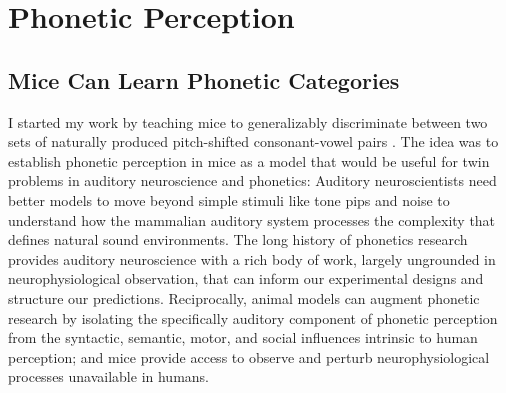 \section{Phonetic Perception}
\label{sec:phonemes}
\subsection{Mice Can Learn Phonetic Categories}

I started my work by teaching mice to generalizably discriminate between two sets of naturally produced pitch-shifted consonant-vowel pairs \cite{saundersMiceCanLearn2019}. The idea was to establish phonetic perception in mice as a model that would be useful for twin problems in auditory neuroscience and phonetics: Auditory neuroscientists need better models to move beyond simple stimuli like tone pips and noise to understand how the mammalian auditory system processes the complexity that defines natural sound environments. The long history of phonetics research provides auditory neuroscience with a rich body of work, largely ungrounded in neurophysiological observation, that can inform our experimental designs and structure our predictions. Reciprocally, animal models can augment phonetic research by isolating the specifically auditory component of phonetic perception from the syntactic, semantic, motor, and social influences intrinsic to human perception; and mice provide access to observe and perturb neurophysiological processes unavailable in humans.

